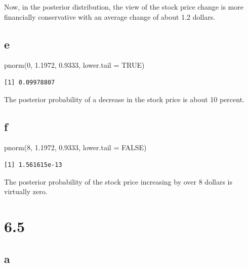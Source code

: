 \documentclass[
  letterpaper,
  DIV=11,
  numbers=noendperiod]{scrartcl}
\newenvironment{Shaded}{\begin{snugshade}}{\end{snugshade}}
\newcommand{\AttributeTok}[1]{\textcolor[rgb]{0.40,0.45,0.13}{#1}}
\newcommand{\ConstantTok}[1]{\textcolor[rgb]{0.56,0.35,0.01}{#1}}
\newcommand{\DecValTok}[1]{\textcolor[rgb]{0.68,0.00,0.00}{#1}}
\newcommand{\FloatTok}[1]{\textcolor[rgb]{0.68,0.00,0.00}{#1}}
\newcommand{\FunctionTok}[1]{\textcolor[rgb]{0.28,0.35,0.67}{#1}}
\newcommand{\NormalTok}[1]{\textcolor[rgb]{0.00,0.23,0.31}{#1}}
\begin{document}
Now, in the posterior distribution, the view of the stock price change
is more financially conservative with an average change of about 1.2
dollars.

\hypertarget{e-1}{%
\subsection{e}\label{e-1}}

\begin{Shaded}
\begin{Highlighting}[]
\FunctionTok{pnorm}\NormalTok{(}\DecValTok{0}\NormalTok{, }\FloatTok{1.1972}\NormalTok{, }\FloatTok{0.9333}\NormalTok{, }\AttributeTok{lower.tail =} \ConstantTok{TRUE}\NormalTok{)}
\end{Highlighting}
\end{Shaded}

\begin{verbatim}
[1] 0.09978807
\end{verbatim}

The posterior probability of a decrease in the stock price is about 10
percent.

\hypertarget{f}{%
\subsection{f}\label{f}}

\begin{Shaded}
\begin{Highlighting}[]
\FunctionTok{pnorm}\NormalTok{(}\DecValTok{8}\NormalTok{, }\FloatTok{1.1972}\NormalTok{, }\FloatTok{0.9333}\NormalTok{, }\AttributeTok{lower.tail =} \ConstantTok{FALSE}\NormalTok{)}
\end{Highlighting}
\end{Shaded}

\begin{verbatim}
[1] 1.561615e-13
\end{verbatim}

The posterior probability of the stock price increasing by over 8
dollars is virtually zero.

\hypertarget{section-4}{%
\section{6.5}\label{section-4}}

\hypertarget{a-4}{%
\subsection{a}\label{a-4}}
\end{document}
